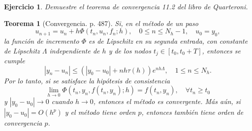 \documentclass[11pt]{article}
\newtheorem{exercise}{Ejercicio}
\newtheorem*{theorem}{Teorema}
\begin{document}
\begin{exercise}
  Demuestre el teorema de convergencia 11.2 del libro de Quarteroni.
\end{exercise}
\begin{theorem}[Convergencia. p. 487]
  Si, en el método de un paso
  \begin{equation*}
    u_{n+1} = u_n + h\Phi(t_n,u_n,f_n;h),
    \quad
    0\leq n\leq N_h-1,
    \quad
    u_0=y_0
    \tag{11.11}
  ,\end{equation*}
  la función de incremento $\Phi$ es de Lipschitz en su segunda
  entrada, con constante de Lipschitz $\Lambda$ independiente de $h$ 
  y de los nodos $t_j\in[t_0,t_0+T]$, entonces se cumple
  \begin{equation*}
    |y_n-u_n|\leq (|y_0-u_0|+nh\tau(h))e^{nh\Lambda},
    \quad
    1\leq n\leq N_h
    \tag{11.20}
  .\end{equation*}
  Por lo tanto, si se satisface la hipótesis de consistencia
  \begin{equation*}
    \lim_{h\to 0} \Phi(t_n,y_n,f(t_n,y_n);h) = f(t_n,y_n),
    \quad
    \forall t_n\geq t_0
    \tag{11.13}
  \end{equation*}
  y $|y_0-u_0|\to 0$ cuando $h\to 0$, entonces el método es
  convergente. Más aún, si $|y_0-u_0|=O(h^p)$ y el método tiene orden
  $p$, entonces también tiene orden de convergencia $p$.
\end{theorem}
\end{document}
